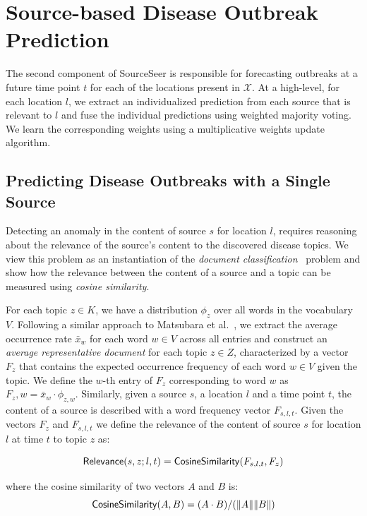 \documentclass[twoside,leqno,twocolumn]{article}
\newcommand{\fullmodel}{{{\sf SourceSeer}}\xspace}
\begin{document}
\section{Source-based Disease Outbreak Prediction}
\label{sec:pred}
The second component of \fullmodel is responsible for forecasting outbreaks at a future time point $t$ for each of the locations present in $\mathcal{X}$. At a high-level, for each location $l$, we extract an individualized prediction from each source that is relevant to $l$ and fuse the individual predictions using weighted majority voting. We learn the corresponding weights using a multiplicative weights update algorithm.

\subsection{Predicting Disease Outbreaks with a Single Source}
\label{sec:source_pred}
Detecting an anomaly in the content of source $s$ for location $l$, requires reasoning about the relevance of the source's content to the discovered disease topics. We view this problem as an instantiation of the {\em document classification}~\cite{strehl:2000} problem and show how the relevance between the content of a source and a topic can be measured using {\em cosine similarity}.

For each topic $z \in K$, we have a distribution $\phi_z$ over all words in the vocabulary $V$. Following a similar approach to Matsubara et al.~\cite{matsubara:2012}, we extract the average occurrence rate $\bar{x}_w$ for each word $w \in V$ across all entries and construct an {\em average representative document} for each topic $z \in Z$, characterized by a vector $F_z$ that contains the expected occurrence frequency of each word $w \in V$ given the topic. We define the $w$-th entry of $F_z$ corresponding to word $w$ as $F_z,w = \bar{x}_w \cdot \phi_{z,w}$. Similarly, given a source $s$,  a location $l$ and a time point $t$, the content of a source is described with a word frequency vector $F_{s,l,t}$. Given the vectors $F_z$ and $F_{s,l,t}$ we define the relevance of the content of source $s$ for location $l$ at time $t$ to topic $z$ as:

\begin{equation}
{\sf Relevance}(s,z;l,t) = {\sf CosineSimilarity}(F_{s,l,t},F_z)
\end{equation}

where the cosine similarity of two vectors $A$ and $B$ is:
\begin{equation}
{\sf CosineSimilarity}(A,B) = (A \cdot B)/(\|A\| \|B\|)
\end{equation}
 
\end{document}
